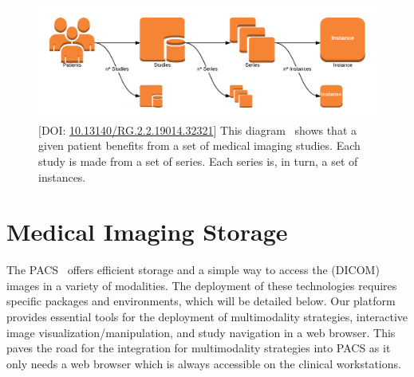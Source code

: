 
\begin{figure}[ht]
\centering
\includegraphics[width=\textwidth]{images/fig025}
\caption{[DOI: \href{https://doi.org/10.13140/RG.2.2.19014.32321}{10.13140/RG.2.2.19014.32321}] This diagram~\cite{calisto2019mips} shows that a given patient benefits from a set of medical imaging studies. Each study is made from a set of series. Each series is, in turn, a set of instances.}
\label{fig:fig025}
\end{figure}

\section{Medical Imaging Storage}
\label{sec:sec002008}

The \ac{PACS}~\cite{carter2018digital} offers efficient storage and a simple way to access the (\ac{DICOM}) images in a variety of modalities.
The deployment of these technologies requires specific packages and environments, which will be detailed below.
Our platform provides essential tools for the deployment of multimodality strategies, interactive image visualization/manipulation, and study navigation in a web browser.
This paves the road for the integration for multimodality strategies into \ac{PACS} as it only needs a web browser which is always accessible on the clinical workstations.